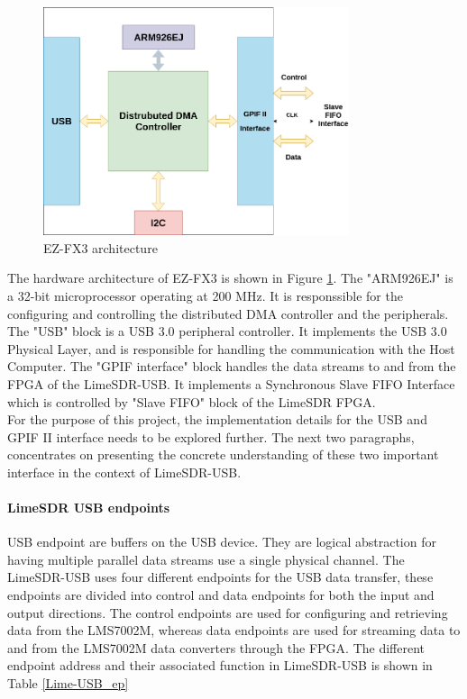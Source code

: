 \begin{figure}[h!]
\centering
\hspace*{2.5cm}\includegraphics[width=0.8\textwidth]{Figure/FX3.png}
\caption{EZ-FX3 architecture}
\label{FX3_arch}
\end{figure}
The hardware architecture of EZ-FX3 is shown in Figure \ref{FX3_arch}.
The "ARM926EJ" is a 32-bit microprocessor operating at 200 MHz.
It is responssible for the configuring and controlling the distributed \ac{DMA} controller and the peripherals.
The "USB" block is a \ac{USB} 3.0 peripheral controller.
It implements the \ac{USB} 3.0 Physical Layer, and is responsible for handling the communication with the Host Computer.
The "\ac{GPIF} interface" block handles the data streams to and from the \ac{FPGA} of the LimeSDR-USB. 
It implements a Synchronous Slave FIFO Interface which is controlled by "Slave FIFO" block of the LimeSDR \ac{FPGA}.\\

For the purpose of this project, the implementation details for the USB and GPIF II interface needs to be explored further.
The next two paragraphs, concentrates on presenting the concrete understanding of these two important interface in the context of LimeSDR-USB.

\paragraph{LimeSDR USB endpoints}
\ac{USB} endpoint are buffers on the \ac{USB} device.
They are logical abstraction for having multiple parallel data streams use a single physical channel.
The LimeSDR-USB uses four different endpoints for the USB data transfer, these endpoints are divided into control and data endpoints for both the input and output directions.
The control endpoints are used for configuring and retrieving data from the LMS7002M, whereas data endpoints are used for streaming data to and from the LMS7002M data converters through the \ac{FPGA}.
The different endpoint address and their associated function in LimeSDR-USB is shown in Table \ref{Lime-USB_ep}\\

